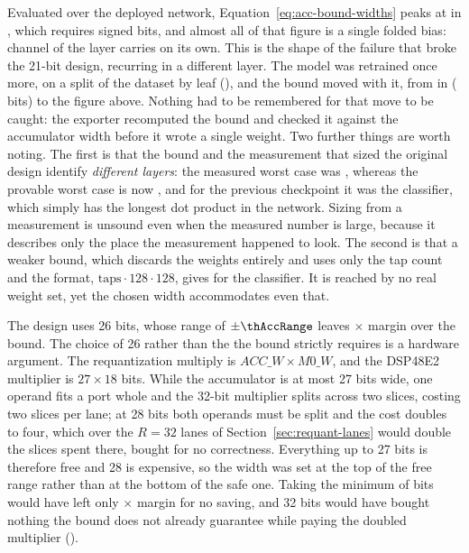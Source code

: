 Evaluated over the deployed network, Equation~\eqref{eq:acc-bound-widths}
peaks at \thAccBound{} in \file{\thAccBoundLayer}, which requires
\thAccBoundBits{} signed bits, and almost all of that figure is a single folded
bias: channel \thAccBoundChannel{} of the layer carries \thAccBoundBias{} on its
own. This is the shape of the failure that broke the 21-bit design, recurring
in a different layer. The model was retrained once more, on a split of the
dataset by leaf (), and the bound moved with it, from \thAccBoundPrev{}
in \file{\thAccBoundPrevLayer} (\thAccBoundPrevBits{} bits) to the figure
above. Nothing had to be remembered for that move to be caught: the exporter
recomputed the bound and checked it against the accumulator width before it
wrote a single weight. Two further things are worth noting. The first is that
the bound and the measurement that sized the original design identify
\emph{different layers}: the measured worst case was
, whereas the provable worst case is now
\file{\thAccBoundLayer}, and for the previous checkpoint it was the classifier,
which simply has the longest dot product in the network. Sizing from a
measurement is unsound even when the measured number is large, because it
describes only the place the measurement happened to look. The second is that a
weaker bound, which discards the weights entirely and uses only the tap count
and the format, $\mathrm{taps} \cdot 128 \cdot 128$, gives \thAccGeom{} for the
classifier. It is reached by no real weight set, yet the chosen width
accommodates even that.

The design uses 26 bits, whose range of $\pm\thAccRange$ leaves
\thAccMargin$\times$ margin over the bound. The choice of 26 rather than the
\thAccBoundBits{} the bound strictly requires is a hardware argument. The
requantization multiply is $\mathit{ACC\_W} \times \mathit{M0\_W}$, and the
DSP48E2 multiplier is $27 \times 18$ bits. While the accumulator is at most 27
bits wide, one operand fits a port whole and the 32-bit multiplier splits
across two slices, costing two slices per lane; at 28 bits both operands must
be split and the cost doubles to four, which over the $R = 32$ lanes of
Section~\ref{sec:requant-lanes} would double the \thRqDsp{} slices spent there,
bought for no correctness. Everything up to 27 bits is therefore free and 28 is
expensive, so the width was set at the top of the free range rather than at
the bottom of the safe one. Taking the minimum of \thAccBoundBits{} bits would
have left only \thAccMarginNarrow$\times$ margin for no saving, and 32 bits
would have bought nothing the bound does not already guarantee while paying
the doubled multiplier ().

